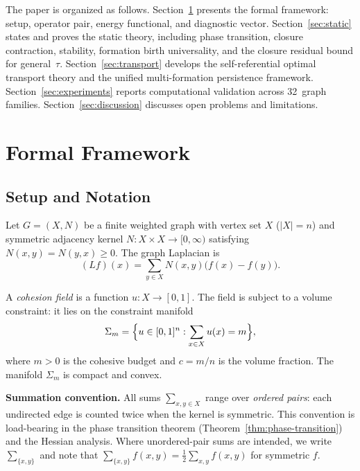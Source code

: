 \documentclass[lettersize,journal]{IEEEtran}
\begin{document}
The paper is organized as follows. Section~\ref{sec:framework} presents the formal framework: setup, operator pair, energy functional, and diagnostic vector. Section~\ref{sec:static} states and proves the static theory, including phase transition, closure contraction, stability, formation birth universality, and the closure residual bound for general~$\tau$. Section~\ref{sec:transport} develops the self-referential optimal transport theory and the unified multi-formation persistence framework. Section~\ref{sec:experiments} reports computational validation across 32~graph families. Section~\ref{sec:discussion} discusses open problems and limitations.

\section{Formal Framework}
\label{sec:framework}

\subsection{Setup and Notation}
\label{sec:setup}

Let $G = (X, N)$ be a finite weighted graph with vertex set $X$ ($|X| = n$) and symmetric adjacency kernel $N : X \times X \to [0,\infty)$ satisfying $N(x,y) = N(y,x) \geq 0$. The graph Laplacian is
\begin{equation}
(Lf)(x) = \sum_{y \in X} N(x,y)\bigl(f(x) - f(y)\bigr).
\end{equation}

A \emph{cohesion field} is a function $u : X \to [0,1]$. The field is subject to a volume constraint: it lies on the constraint manifold
\begin{equation}
\Sigma_m = \Bigl\{u \in [0,1]^n : \sum_{x \in X} u(x) = m\Bigr\},
\end{equation}
where $m > 0$ is the cohesive budget and $c = m/n$ is the volume fraction. The manifold $\Sigma_m$ is compact and convex.

\textbf{Summation convention.} All sums $\sum_{x,y \in X}$ range over \emph{ordered pairs}: each undirected edge is counted twice when the kernel is symmetric. This convention is load-bearing in the phase transition theorem (Theorem~\ref{thm:phase-transition}) and the Hessian analysis. Where unordered-pair sums are intended, we write $\sum_{\{x,y\}}$ and note that $\sum_{\{x,y\}} f(x,y) = \frac{1}{2}\sum_{x,y} f(x,y)$ for symmetric $f$.
\end{document}
